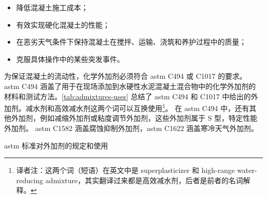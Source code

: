 \begin{itemize}
  \item 降低混凝土施工成本；
  \item 有效实现硬化混凝土的性能；
  \item 在恶劣天气条件下保持混凝土在搅拌、运输、浇筑和养护过程中的质量；
  \item 克服具体操作中的某些突发事件。
\end{itemize}

为保证混凝土的流动性，化学外加剂必须符合 \acrshort*{astm} C494 或 C1017 的要求。 \acrshort*{astm} C494 涵盖了用于在现场添加到水硬性水泥混凝土混合物中的化学外加剂的材料和测试方法。\cref{tab:admixtures-uses} 总结了 \acrshort*{astm} C494 和 C1017 中给出的外加剂。减水剂和高效减水剂这两个词可以互换使用\footnote{译者注：这两个词（短语）在英文中是 superplasticizer 和 high-range water-reducing admixture，其实翻译过来都是高效减水剂，后者是前者的名词解释。}。 在 \acrshort*{astm} C494 中，还有其他外加剂，例如减缩外加剂或粘度调节外加剂，这些外加剂属于 S 型，特定性能外加剂。 \acrshort*{astm} C1582 涵盖腐蚀抑制外加剂，\acrshort*{astm} C1622 涵盖寒冷天气外加剂。

\begin{table}
  \caption{\acrshort*{astm} 标准对外加剂的规定和使用}
  \label{tab:admixtures-uses}
  
\end{table}

